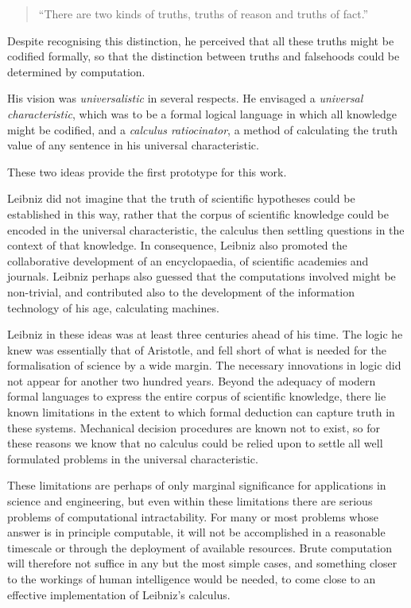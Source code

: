 \begin{quote}
``There are two kinds of truths, truths of reason and truths of fact.''
\end{quote}

Despite recognising this distinction, he perceived that all these truths might be codified formally, so that the distinction between truths and falsehoods could be determined by computation.

His vision was \emph{universalistic} in several respects.
He envisaged a \emph{universal characteristic}, which was to be a formal logical language in which all knowledge might be codified, and a \emph{calculus ratiocinator}, a method of calculating the truth value of any sentence in his universal characteristic.

These two ideas provide the first prototype for this work.

Leibniz did not imagine that the truth of scientific hypotheses could be established in this way, rather that the corpus of scientific knowledge could be encoded in the universal characteristic, the calculus then settling questions in the context of that knowledge.
In consequence, Leibniz also promoted the collaborative development of an encyclopaedia, of scientific academies and journals.
Leibniz perhaps also guessed that the computations involved might be non-trivial, and contributed also to the development of the information technology of his age, calculating machines.

Leibniz in these ideas was at least three centuries ahead of his time.
The logic he knew was essentially that of Aristotle, and fell short of what is needed for the formalisation of science by a wide margin.
The necessary innovations in logic did not appear for another two hundred years.
Beyond the adequacy of modern formal languages to express the entire corpus of scientific knowledge, there lie known limitations in the extent to which formal deduction can capture truth in these systems.
Mechanical decision procedures are known not to exist, so for these reasons we know that no calculus could be relied upon to settle all well formulated problems in the universal characteristic.

These limitations are perhaps of only marginal significance for applications in science and engineering, but even within these limitations there are serious problems of computational intractability.
For many or most problems whose answer is in principle computable, it will not be accomplished in a reasonable timescale or through the deployment of available resources.
Brute computation will therefore not suffice in any but the most simple cases, and something closer to the workings of human intelligence would be needed, to come close to an effective implementation of Leibniz's calculus.

